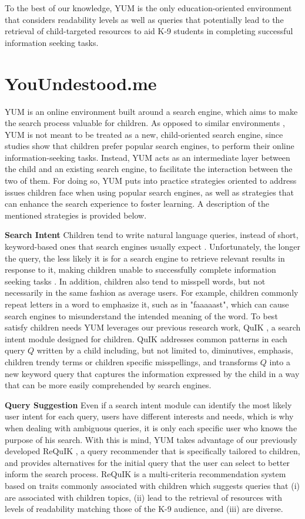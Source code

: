 \documentclass{sig-alternate-05-2015}
\begin{document}
To the best of our knowledge, YUM is the only education-oriented environment that considers readability levels as well as queries that potentially lead to the retrieval of child-targeted resources to aid K-9 students in completing successful information seeking tasks.
\section{YouUndestood.me}
\label{sec:method}
YUM is an online environment built around a search engine, which aims to make the search process valuable for children. As opposed to similar environments \cite{Ust14}, YUM is not meant to be treated as a new, child-oriented search engine, since studies \cite{Bil13} show that children prefer popular search engines, to perform their online information-seeking tasks. Instead, YUM acts as an intermediate layer between the child and an existing search engine, to facilitate the interaction between the two of them. For doing so, YUM puts into practice strategies oriented to address issues children face when using popular search engines, as well as strategies that can enhance the search experience to foster learning.  A description of the mentioned strategies is provided below.

\noindent
\textbf{Search Intent} Children tend to write natural language queries, instead of short, keyword-based ones that search engines usually expect \cite{Dru09}. Unfortunately, the longer the query, the less likely it is for a  search engine to retrieve relevant results in response to it, making children unable to successfully complete information seeking tasks \cite{Dru09}. In addition, children also tend to misspell words, but not necessarily in the same fashion as average users. For example, children commonly repeat letters in a word to emphasize it, such as in "faaaaast", which can cause search engines to misunderstand the intended meaning of the word. To best satisfy children needs YUM leverages our previous research work, QuIK \cite{Quik}, a search intent module designed  for children. QuIK addresses common patterns in each query $Q$ written by a child including, but not limited to, diminutives, emphasis, children trendy terms or children specific misspellings, and transforms $Q$ into a new keyword query that captures the information expressed by the child in a way that can be more easily comprehended by search engines.

\noindent
\textbf{Query Suggestion} Even if a search intent module can identify the most likely user intent for each query, users have different interests and needs, which is why when dealing with ambiguous queries, it is only each specific user who knows the purpose of his search. With this is mind,  YUM takes advantage of our previously developed ReQuIK \cite{Requik}, a query recommender that is specifically tailored to children, and provides alternatives for the initial query that the user can select to better inform the search process. ReQuIK is a multi-criteria recommendation system based on traits commonly associated with children which suggests queries that (i) are associated with children topics, (ii) lead to the retrieval of resources with levels of readability matching those of the K-9 audience, and (iii) are diverse.
\end{document}
